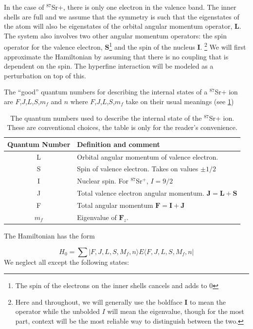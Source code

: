 In the case of $^{87}$Sr+, there is only one electron in the valence band. The inner shells are full and we assume that the symmetry is such that the eigenstates of the atom will also be eigenstates of the orbital angular momentum operator, $\mathbf{L}$.
 The system also involves two other angular momentum operators: the spin operator for the valence electron, $\mathbf{S}$\footnote{The spin of the electrons on the inner shells cancels and adds to 0} and the spin of the nucleus $\mathbf{I}$.
\footnote{Here and throughout, we will generally use the boldface $\mathbf{I}$ to mean the operator while the unbolded $I$ will mean the eigenvalue, though for the most part, context will be the most reliable way to distinguish between the two.}
We will first approximate the Hamiltonian by assuming that there is no coupling that is dependent on the spin. 
The hyperfine interaction will be modeled as a perturbation on top of this.

The ``good'' quantum numbers for describing the internal states of a $^{87}$Sr+ ion are $F$,$J$,$L$,$S$,$m_f$ and $n$\cite{experimental_hyperfine_alkali_arimondo}\cite{cuaMITnotes} where $F$,$J$,$L$,$S$,$m_f$ take on their usual meanings (see \ref{quantumNumberQuickref})

\begin{table}[h!]
\centering
\begin{tabular}{|c|l|}
\hline
Quantum Number & Definition and comment \\ \hline \hline
L & Orbital angular momentum of valence electron. \\ \hline
S & Spin of valence electron. Takes on values $\pm 1/2$ \\ \hline
I & Nuclear spin. For $^{87}$Sr$^+$, $I=9/2$ \\ \hline
J & Total valence electron angular momentum. $\mathbf{J}=\mathbf{L}+\mathbf{S}$ \\ \hline
F & Total angular momentum $\mathbf{F}=\mathbf{I}+\mathbf{J}$ \\ \hline
$m_f$ & Eigenvalue of $\mathbf{F}_z$.\\ \hline
\end{tabular}
\caption{The quantum numbers used to describe the internal state of the $^{87}$Sr+ ion. These are conventional choices, the table is only for the reader's convenience.}
\label{quantumNumberQuickref}
\end{table}

The Hamiltonian has the form 

\begin{equation}
H_0=\sum |F,J,L,S,M_f,n\rangle E \langle F,J,L,S,M_f,n|
\end{equation}
We neglect all except the following states: %

